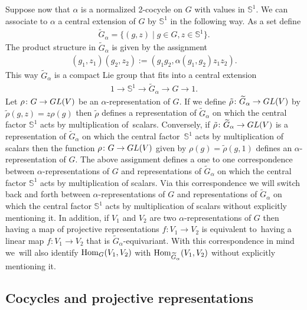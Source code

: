 \documentclass[11pt]{article}
\numberwithin{equation}{section}
\def\S{\mathbb{S}}
\DeclareMathOperator{\Hom}{\textup{Hom}}
\theoremstyle{definition}
\numberwithin{equation}{section}
\begin{document}
Suppose now that $\alpha$ is a normalized 2-cocycle on $G$ with values in $\S^{1}$.
We can associate to $\alpha$ a central extension of $G$ by $\S^{1}$ in the following way.
As a set define
\begin{gather*}%
\widetilde{G}_{\alpha}=\big\{(g,z)\mid g\in G, z\in \S^{1}\big\}.
\end{gather*}
The product structure in $\widetilde{G}_{\alpha}$ is given by
the assignment
\begin{gather*}
(g_{1},z_{1})(g_{2},z_{2}):=\left(g_{1}g_{2},\alpha(g_{1},g_{2})z_{1}z_{2}\right).
\end{gather*}
This way $\widetilde{G}_{\alpha}$ is a compact Lie group that fits
into a central extension
\begin{gather*}
1\rightarrow \S^{1}\rightarrow
\widetilde{G}_{\alpha}\rightarrow G\rightarrow 1.
\end{gather*}
Let $\rho\colon G\to {\rm GL}(V)$ be an $\alpha$-representation of $G$. If we define
$\tilde{\rho}\colon \widetilde{G}_{\alpha}\to {\rm GL}(V)$
by $\tilde{\rho}(g,z)=z\rho(g)$ then $\tilde{\rho}$ defines a representation of
$\widetilde{G}_{\alpha}$ on which the central factor $\S^{1}$ acts by multiplication of~scalars.
Conversely, if $\tilde{\rho}\colon \widetilde{G}_{\alpha}\to {\rm GL}(V)$ is a representation of
$\widetilde{G}_{\alpha}$ on which the central factor~$\S^{1}$ acts by multiplication of scalars
then the function $\rho\colon G\to {\rm GL}(V)$ given by $\rho(g)=\tilde{\rho}(g,1)$ defines an
$\alpha$-representation of $G$. The above assignment defines a one to one correspondence between
$\alpha$-representations of $G$ and representations of $\widetilde{G}_{\alpha}$ on which the
central factor $\S^{1}$ acts by multiplication of scalars. Via this correspondence we will
switch back and forth between $\alpha$-representations of $G$ and representations of
$\widetilde{G}_{\alpha}$ on which the central factor $\S^{1}$ acts by multiplication of scalars
without explicitly mentioning it. In addition, if $V_{1}$ and $V_{2}$ are two
$\alpha$-repre\-sentations of $G$ then having a map of projective representations
$f\colon V_{1}\to V_{2}$ is equivalent to~having a linear map
$f\colon V_{1}\to V_{2}$ that is $\widetilde{G}_{\alpha}$-equivariant. With this correspondence
in mind we~will also identify $\Hom_{G}(V_{1},V_{2})$ with
$\Hom_{\widetilde{G}_{\alpha}}(V_{1},V_{2})$ without explicitly mentioning it.

\subsection{Cocycles and projective representations}\label{section cocycles}
\end{document}
